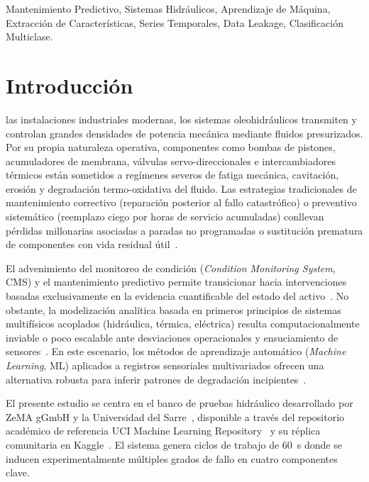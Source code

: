 \documentclass[journal]{IEEEtran}
\begin{document}
\begin{IEEEkeywords}
Mantenimiento Predictivo, Sistemas Hidráulicos, Aprendizaje de Máquina, Extracción de Características, Series Temporales, Data Leakage, Clasificación Multiclase.
\end{IEEEkeywords}

\section{Introducción}
\label{sec:intro}

 las instalaciones industriales modernas, los sistemas oleohidráulicos transmiten y controlan grandes densidades de potencia mecánica mediante fluidos presurizados. Por su propia naturaleza operativa, componentes como bombas de pistones, acumuladores de membrana, válvulas servo-direccionales e intercambiadores térmicos están sometidos a regímenes severos de fatiga mecánica, cavitación, erosión y degradación termo-oxidativa del fluido. Las estrategias tradicionales de mantenimiento correctivo (reparación posterior al fallo catastrófico) o preventivo sistemático (reemplazo ciego por horas de servicio acumuladas) conllevan pérdidas millonarias asociadas a paradas no programadas o sustitución prematura de componentes con vida residual útil~\cite{Helwig2015}.

El advenimiento del monitoreo de condición (\emph{Condition Monitoring System}, CMS) y el mantenimiento predictivo permite transicionar hacia intervenciones basadas exclusivamente en la evidencia cuantificable del estado del activo~\cite{Luong2019}. No obstante, la modelización analítica basada en primeros principios de sistemas multifísicos acoplados (hidráulica, térmica, eléctrica) resulta computacionalmente inviable o poco escalable ante desviaciones operacionales y ensuciamiento de sensores~\cite{Helwig2015b}. En este escenario, los métodos de aprendizaje automático (\emph{Machine Learning}, ML) aplicados a registros sensoriales multivariados ofrecen una alternativa robusta para inferir patrones de degradación incipientes~\cite{Schneider2017, Pedregosa2011}.

El presente estudio se centra en el banco de pruebas hidráulico desarrollado por ZeMA gGmbH y la Universidad del Sarre~\cite{Helwig2015}, disponible a través del repositorio académico de referencia UCI Machine Learning Repository~\cite{UCI_Dataset} y su réplica comunitaria en Kaggle~\cite{Kaggle_Dataset}. El sistema genera ciclos de trabajo de \SI{60}{\second} donde se inducen experimentalmente múltiples grados de fallo en cuatro componentes clave.
\end{document}
